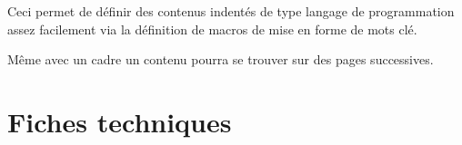 \documentclass[12pt,a4paper]{article}
\begin{document}
\newcommand\squaremacro{$x^2$}



\begin{remark}
	Ceci permet de définir des contenus indentés de type langage de programmation assez facilement via la définition de macros de mise en forme de mots clé.
\end{remark}





Même avec un cadre un contenu pourra se trouver sur des pages successives.

\begin{figure}[hbt!]
	\centering
\end{figure}




\section{Fiches techniques}
\end{document}
